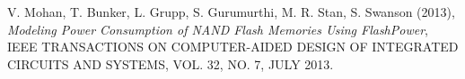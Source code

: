 \documentclass[a4paper,12pt,oneside]{book}
\begin{document}

\tableofcontents
\listoffigures

\newpage





\mainmatter


\begin{thebibliography}{9}
	V. Mohan, T. Bunker, L. Grupp, S. Gurumurthi,
	M. R. Stan, S. Swanson (2013),
	\emph{Modeling Power Consumption of NAND Flash
		Memories Using FlashPower}, IEEE TRANSACTIONS ON COMPUTER-AIDED DESIGN OF INTEGRATED CIRCUITS AND SYSTEMS, VOL. 32, NO. 7, JULY 2013.
\end{thebibliography}
\end{document}
